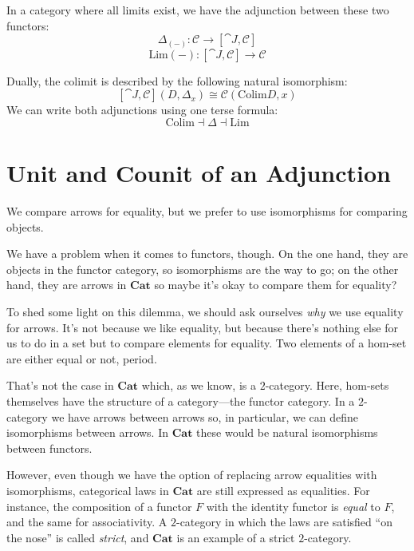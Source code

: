 \documentclass[DaoFP]{subfiles}
\begin{document}
In a category where all limits exist, we have the adjunction between these two functors:
\[ \Delta_{(-)} \colon \mathcal{C} \to  [\cat J, \mathcal{C}] \]
\[ \text{Lim}{(-)} \colon  [\cat J, \mathcal{C}] \to \mathcal{C} \]

Dually, the colimit is described by the following natural isomorphism:
\[ [\cat J, \mathcal{C}](D, \Delta_x)  \cong \mathcal{C}( \text{Colim} D, x) \]
We can write both adjunctions using one terse formula:
\[ \text{Colim} \dashv \Delta \dashv \text{Lim}\]

\section{Unit and Counit of an Adjunction}

We compare arrows for equality, but we prefer to use isomorphisms for comparing objects. 

We have a problem when it comes to functors, though. On the one hand, they are objects in the functor category, so isomorphisms are the way to go; on the other hand, they are arrows in $\mathbf{Cat}$ so maybe it's okay to compare them for equality?

To shed some light on this dilemma, we should ask ourselves \emph{why} we use equality for arrows. It's not because we like equality, but because there's nothing else for us to do in a set but to compare elements for equality. Two elements of a hom-set are either equal or not, period. 

That's not the case in  $\mathbf{Cat}$ which, as we know, is a $2$-category. Here, hom-sets themselves have the structure of a category---the functor category. In a $2$-category we have arrows between arrows so, in particular, we can define isomorphisms between arrows. In $\mathbf{Cat}$ these would be natural isomorphisms between functors.

However, even though we have the option of replacing arrow equalities with isomorphisms, categorical laws in $\mathbf{Cat}$ are still expressed as equalities. For instance, the composition of a functor $F$ with the identity functor is \emph{equal} to $F$, and the same for associativity. A $2$-category in which the laws are satisfied ``on the nose'' is called \emph{strict}, and $\mathbf{Cat}$ is an example of a strict $2$-category. 
\end{document}
